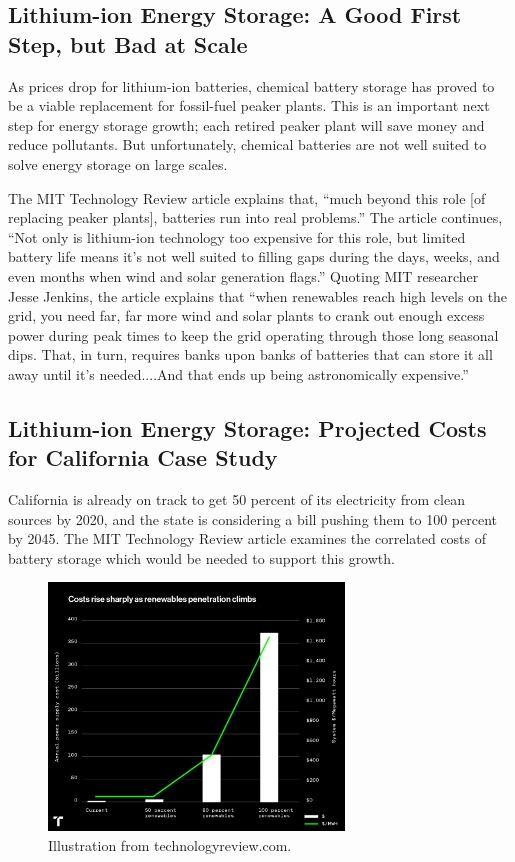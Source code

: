 \documentclass[hidelinks,12pt,a4paper]{article}
\begin{document}
\subsection{Lithium-ion Energy Storage: A Good First Step, but Bad at Scale}
As prices drop for lithium-ion batteries, chemical battery storage has proved to be a viable replacement for fossil-fuel peaker plants. This is an important next step for energy storage growth; each retired peaker plant will save money and reduce pollutants. But unfortunately, chemical batteries are not well suited to solve energy storage on large scales.

The MIT Technology Review article explains that, “much beyond this role [of replacing peaker plants], batteries run into real problems.” \cite{TheTwoPointFiveTrillionReasonWeCantRelyOnBatteries} The article continues, “Not only is lithium-ion technology too expensive for this role, but limited battery life means it’s not well suited to filling gaps during the days, weeks, and even months when wind and solar generation flags.” \cite{TheTwoPointFiveTrillionReasonWeCantRelyOnBatteries} Quoting MIT researcher Jesse Jenkins, the article explains that “when renewables reach high levels on the grid, you need far, far more wind and solar plants to crank out enough excess power during peak times to keep the grid operating through those long seasonal dips. That, in turn, requires banks upon banks of batteries that can store it all away until it’s needed....And that ends up being astronomically expensive.” \cite{TheTwoPointFiveTrillionReasonWeCantRelyOnBatteries}

\subsection{Lithium-ion Energy Storage: Projected Costs for California Case Study}

California is already on track to get 50 percent of its electricity from clean sources by 2020, and the state is considering a bill pushing them to 100 percent by 2045. The MIT Technology Review article examines the correlated costs of battery storage which would be needed to support this growth.

\begin{figure}[ht!]
    \centering
    \includegraphics[width=0.7\textwidth]{batterystorage-02_0.png}
    \caption{Illustration from technologyreview.com. \cite{TheTwoPointFiveTrillionReasonWeCantRelyOnBatteries}}
\end{figure}
\FloatBarrier
\end{document}
